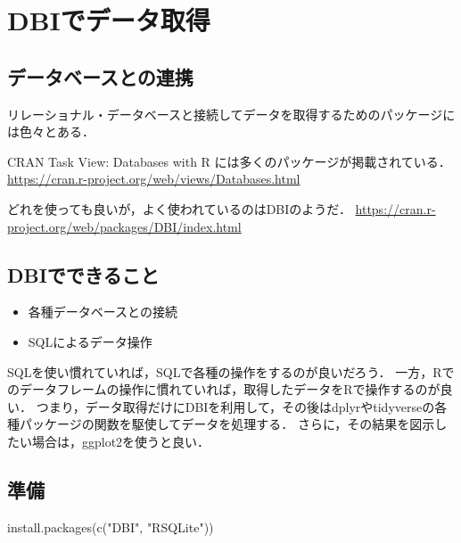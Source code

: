 \documentclass[
]{article}
\newenvironment{Shaded}{\begin{snugshade}}{\end{snugshade}}
\newcommand{\FunctionTok}[1]{\textcolor[rgb]{0.00,0.00,0.00}{#1}}
\newcommand{\NormalTok}[1]{#1}
\newcommand{\StringTok}[1]{\textcolor[rgb]{0.31,0.60,0.02}{#1}}
\providecommand{\tightlist}{%
  \setlength{\itemsep}{0pt}\setlength{\parskip}{0pt}}
\begin{document}
\hypertarget{dbi}{%
\section{DBIでデータ取得}\label{dbi}}

\hypertarget{ux30c7ux30fcux30bfux30d9ux30fcux30b9ux3068ux306eux9023ux643a}{%
\subsection{データベースとの連携}\label{ux30c7ux30fcux30bfux30d9ux30fcux30b9ux3068ux306eux9023ux643a}}

リレーショナル・データベースと接続してデータを取得するためのパッケージには色々とある．

CRAN Task View: Databases with R には多くのパッケージが掲載されている．
\url{https://cran.r-project.org/web/views/Databases.html}

どれを使っても良いが，よく使われているのはDBIのようだ．
\url{https://cran.r-project.org/web/packages/DBI/index.html}

\hypertarget{dbiux3067ux3067ux304dux308bux3053ux3068}{%
\subsection{DBIでできること}\label{dbiux3067ux3067ux304dux308bux3053ux3068}}

\begin{itemize}
\tightlist
\item
  各種データベースとの接続\\
\item
  SQLによるデータ操作
\end{itemize}

SQLを使い慣れていれば，SQLで各種の操作をするのが良いだろう．
一方，Rでのデータフレームの操作に慣れていれば，取得したデータをRで操作するのが良い．
つまり，データ取得だけにDBIを利用して，その後はdplyrやtidyverseの各種パッケージの関数を駆使してデータを処理する．
さらに，その結果を図示したい場合は，ggplot2を使うと良い．

\hypertarget{ux6e96ux5099-13}{%
\subsection{準備}\label{ux6e96ux5099-13}}

\begin{Shaded}
\begin{Highlighting}[]
\FunctionTok{install.packages}\NormalTok{(}\FunctionTok{c}\NormalTok{(}\StringTok{"DBI"}\NormalTok{, }\StringTok{"RSQLite"}\NormalTok{))}
\end{Highlighting}
\end{Shaded}
\end{document}

